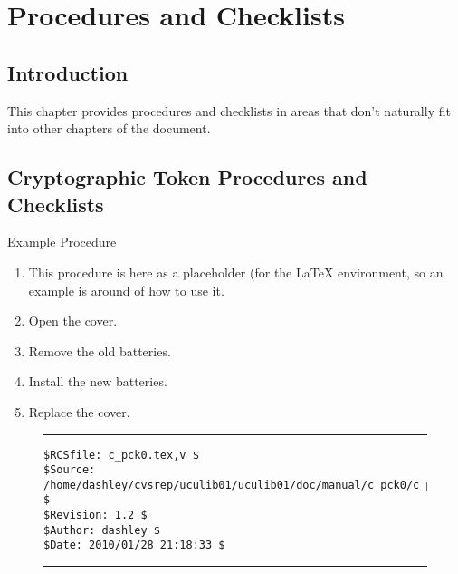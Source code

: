 
\chapter{Procedures and Checklists}

\label{cpck0}

\section{Introduction}
\label{cpck0:sint0}

This chapter provides procedures and checklists in areas that don't
naturally fit into other chapters of the document.


\section{Cryptographic Token Procedures and Checklists}
\label{cpck0:sctk0}

\begin{procchklst}{Example Procedure}%
\label{proc:cpck0:sctk0:01}%
\begin{enumerate}
\item This procedure is here as a placeholder (for the \LaTeX{} environment, so
      an example is around of how to use it.
\item Open the cover.
\item Remove the old batteries.
\item Install the new batteries.
\item Replace the cover.
\end{enumerate}
\end{procchklst}
\procchklstfooter{}

\noindent\begin{figure}[!b]
\noindent\rule[-0.25in]{\textwidth}{1pt}
\begin{tiny}
\begin{verbatim}
$RCSfile: c_pck0.tex,v $
$Source: /home/dashley/cvsrep/uculib01/uculib01/doc/manual/c_pck0/c_pck0.tex,v $
$Revision: 1.2 $
$Author: dashley $
$Date: 2010/01/28 21:18:33 $
\end{verbatim}
\end{tiny}
\noindent\rule[0.25in]{\textwidth}{1pt}
\end{figure}

